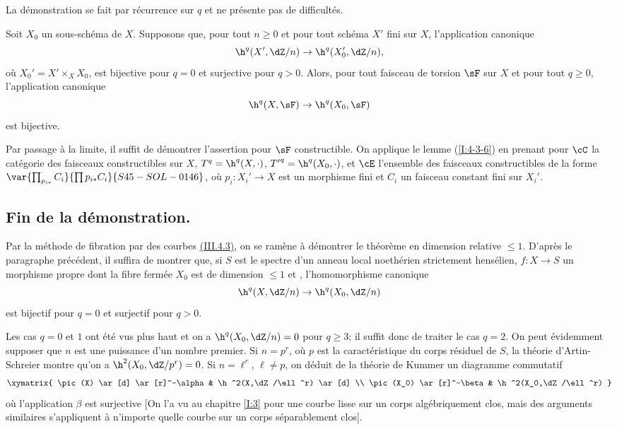 La démonstration se fait par récurrence sur $q$ et ne présente pas de 
difficultés. 





\begin{propositiondotdash}\label{I:4-3-7}
Soit $X_0$ un sous-schéma de $X$. Supposons que, pour tout $n\geqslant 0$ et 
pour tout schéma $X'$ fini sur $X$, l'application canonique 
\[
  \h^q(X',\dZ/n) \to \h^q(X_0',\dZ/n)\text{,}
\]
où $X_0' = X'\times_X X_0$, est bijective pour $q=0$ et surjective pour 
$q>0$. Alors, pour tout faisceau de torsion $\sF$ sur $X$ et pour tout 
$q\geqslant 0$, l'application canonique 
\[
  \h^q(X,\sF) \to \h^q(X_0,\sF)
\]
est bijective.
\end{propositiondotdash}

Par passage à la limite, il suffit de démontrer l'assertion pour $\sF$ 
constructible. On applique le lemme (\ref{I:4-3-6}) en prenant pour $\cC$ la 
catégorie des faisceaux constructibles sur $X$, $T^q=\h^q(X,\cdot)$, 
${T'}^q=\h^q(X_0,\cdot)$, et $\cE$ l'ensemble des faisceaux constructibles de la 
forme $\var{\prod_{p_{i*}} C_i}{\prod p_{i*} C_i}{S45-SOL-0146}$, où $p_i:X_i'\to X$ est un morphisme fini et $C_i$ 
un faisceau constant fini sur $X_i'$. 










\subsection{Fin de la démonstration.}\label{I:4-4}

Par la méthode de fibration par des courbes \hyperref[I:3-4-3]{(III.4.3)}, on se ramène 
à démontrer le théorème en dimension relative $\leqslant 1$. D'après 
le paragraphe précédent, il suffira de montrer que, si $S$ est le spectre 
d'un anneau local noethérien strictement hensélien, $f:X\to S$ un 
morphisme propre dont la fibre fermée $X_0$ est de dimension $\leqslant 1$ 
et , l'homomorphisme canonique 
\[
  \h^q(X,\dZ/n) \to \h^q(X_0,\dZ/n)
\]
est bijectif pour $q=0$ et surjectif pour $q>0$. 

Les cas $q=0$ et $1$ ont été vus plus haut et on a $\h^q(X_0,\dZ/n) = 0$ 
pour $q\geqslant 3$; il suffit donc de traiter le cas $q=2$. On peut 
évidemment supposer que $n$ est une puissance d'un nombre premier. Si 
$n=p^r$, où $p$ est la caractéristique du corps résiduel de $S$, la 
théorie d'Artin-Schreier montre qu'on a $\h^2(X_0,\dZ/p^r) = 0$. Si 
$n=\ell^r$, $\ell\ne p$, on déduit de la théorie de Kummer un diagramme 
commutatif 
\[\xymatrix{
  \pic(X) \ar[d] \ar[r]^-\alpha 
    & \h^2(X,\dZ/\ell^r) \ar[d] \\
  \pic(X_0) \ar[r]^-\beta 
    & \h^2(X_0,\dZ/\ell^r)
}\]
où l'application $\beta$ est surjective [On l'a vu au chapitre \ref{I:3} pour 
une courbe lisse sur un corps algébriquement clos, mais des arguments 
similaires s'appliquent à n'importe quelle courbe sur un corps 
séparablement clos]. 

